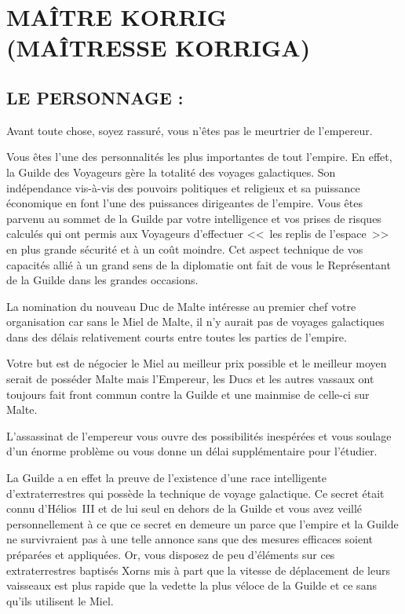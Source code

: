 \documentclass[14pt,twocolumn]{extarticle}
\begin{document}
\section{MAÎTRE KORRIG\\(MAÎTRESSE KORRIGA)}

\subsection{LE PERSONNAGE :}

Avant toute chose, soyez rassuré, vous n'êtes pas le meurtrier de l'empereur.

Vous êtes l'une des personnalités les plus importantes de tout l'empire. En
effet, la Guilde des Voyageurs gère la totalité des voyages galactiques. Son
indépendance vis-à-vis des pouvoirs politiques et religieux et sa puissance
économique en font l'une des puissances dirigeantes de l'empire. Vous êtes
parvenu au sommet de la Guilde par votre intelligence et vos prises de risques
calculés qui ont permis aux Voyageurs d'effectuer <<~les replis de l'espace~>>
en plus grande sécurité et à un coût moindre. Cet aspect technique de vos
capacités allié à un grand sens de la diplomatie ont fait de vous le
Représentant de la Guilde dans les grandes occasions.

La nomination du nouveau Duc de Malte intéresse au premier chef votre
organisation car sans le Miel de Malte, il n'y aurait pas de voyages
galactiques dans des délais relativement courts entre toutes les parties de
l'empire.

Votre but est de négocier le Miel au meilleur prix possible et le meilleur
moyen serait de posséder Malte mais l'Empereur, les Ducs et les autres vassaux
ont toujours fait front commun contre la Guilde et une mainmise de celle-ci sur
Malte.

L'assassinat de l'empereur vous ouvre des possibilités inespérées et vous
soulage d'un énorme problème ou vous donne un délai supplémentaire pour
l'étudier.

La Guilde a en effet la preuve de l'existence d'une race intelligente
d'extraterrestres qui possède la technique de voyage galactique. Ce secret
était connu d'Hélios~III et de lui seul en dehors de la Guilde et vous avez
veillé personnellement à ce que ce secret en demeure un parce que l'empire et
la Guilde ne survivraient pas à une telle annonce sans que des mesures
efficaces soient préparées et appliquées. Or, vous disposez de peu d'éléments
sur ces extraterrestres baptisés Xorns mis à part que la vitesse de déplacement
de leurs vaisseaux est plus rapide que la vedette la plus véloce de la Guilde
et ce sans qu'ils utilisent le Miel.
\end{document}
